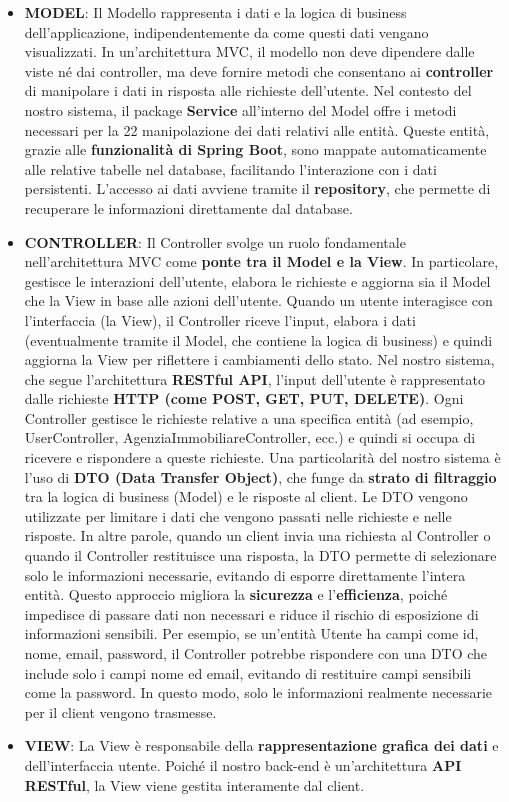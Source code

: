 \begin{itemize}
	
	\item \textbf{MODEL}: Il Modello rappresenta i dati e la logica di business dell’applicazione, indipendentemente da come questi dati vengano visualizzati. In un’architettura MVC, il modello non deve dipendere dalle viste né dai controller, ma deve fornire metodi che consentano ai \textbf{controller} di manipolare i dati in risposta alle richieste dell’utente. Nel contesto del
	nostro sistema, il package \textbf{Service} all’interno del Model offre i metodi necessari per la 22 manipolazione dei dati relativi alle entità. Queste entità, grazie alle \textbf{funzionalità di Spring Boot}, sono mappate automaticamente alle relative tabelle nel database, facilitando l’interazione con i dati persistenti. L’accesso ai dati avviene tramite il \textbf{repository}, che permette di recuperare le informazioni direttamente dal database.
	
	\item \textbf{CONTROLLER}:  Il Controller svolge un ruolo fondamentale nell’architettura MVC come \textbf{ponte tra il Model e la View}. In particolare, gestisce le interazioni dell’utente, elabora le richieste e aggiorna sia il Model che la View in base alle azioni dell’utente.
	Quando un utente interagisce con l’interfaccia (la View), il Controller riceve l’input, elabora i dati (eventualmente tramite il Model, che contiene la logica di business) e quindi
	aggiorna la View per riflettere i cambiamenti dello stato. Nel nostro sistema, che segue l’architettura \textbf{RESTful API}, l’input dell’utente è rappresentato dalle richieste \textbf{HTTP (come POST, GET, PUT, DELETE)}. Ogni Controller gestisce le richieste relative a una specifica entità (ad esempio, UserController, AgenziaImmobiliareController, ecc.) e quindi si occupa di ricevere e rispondere a queste richieste. Una particolarità del nostro sistema è l’uso di \textbf{DTO (Data Transfer Object)}, che funge da \textbf{strato di filtraggio} tra la logica di business (Model) e le risposte al client. Le DTO vengono utilizzate per limitare i dati che vengono passati nelle richieste e nelle risposte. In altre parole, quando un client invia una richiesta al Controller o quando il Controller restituisce una risposta, la DTO permette di selezionare solo le informazioni necessarie, evitando di esporre direttamente l’intera entità. Questo approccio migliora la \textbf{sicurezza} e l’\textbf{efficienza}, poiché impedisce di passare dati non necessari e riduce il rischio di esposizione di informazioni sensibili. Per esempio, se un’entità Utente ha campi come id, nome, email, password, il Controller potrebbe rispondere con una DTO che include solo i campi nome ed email, evitando di restituire campi sensibili come la password. In questo modo, solo le informazioni realmente necessarie per il client vengono trasmesse.
	
	\item \textbf{VIEW}: La View è responsabile della \textbf{rappresentazione grafica dei dati} e dell’interfaccia utente. Poiché il nostro back-end è un’architettura \textbf{API RESTful}, la View viene gestita interamente dal client.
	
\end{itemize}
